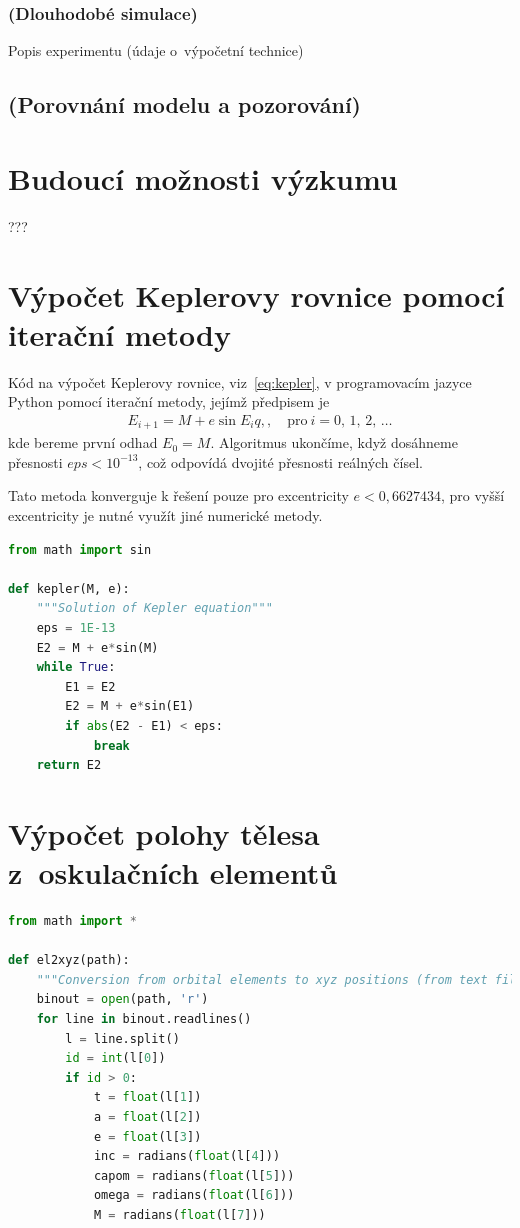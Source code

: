 \documentclass[A4paper, 12pt, oneside]{book}
\begin{document}
\subsection{(Dlouhodobé simulace)}
Popis experimentu (údaje o~výpočetní technice)
\section{(Porovnání modelu a pozorování)}

\chapter{Budoucí možnosti výzkumu}
???

\newpage

\printbibliography

\begin{appendices}
	\chapter{Výpočet Keplerovy rovnice pomocí iterační metody} \label{app:kepit}
	Kód na výpočet Keplerovy rovnice, viz~\eqref{eq:kepler}, v programovacím jazyce Python pomocí iterační metody, jejímž předpisem je
	\begin{align*}
		E_{i+1}=M+e\sin{E_i}q,, \quad \text{pro}\ i=0,\,1,\,2,\,\ldots
	\end{align*}
	kde bereme první odhad $E_0=M$. Algoritmus ukončíme, když dosáhneme přesnosti $eps<10^{-13}$, což odpovídá dvojité přesnosti reálných čísel.

	Tato metoda konverguje k řešení pouze pro excentricity $e<0,6627434$, pro vyšší excentricity je nutné využít jiné numerické metody.
\begin{lstlisting}[language=Python]
from math import sin

def kepler(M, e):
    """Solution of Kepler equation"""
    eps = 1E-13
    E2 = M + e*sin(M)
    while True:
        E1 = E2
        E2 = M + e*sin(E1)
        if abs(E2 - E1) < eps:
            break 
    return E2
\end{lstlisting}
	\chapter{Výpočet polohy tělesa z~oskulačních elementů} \label{app:el2xyz}
	\begin{lstlisting}[language=Python]
from math import *

def el2xyz(path):
    """Conversion from orbital elements to xyz positions (from text file bin.out by program follow2)"""
    binout = open(path, 'r')
    for line in binout.readlines()
        l = line.split()
        id = int(l[0])
        if id > 0:
            t = float(l[1])
            a = float(l[2])
            e = float(l[3])
            inc = radians(float(l[4]))
            capom = radians(float(l[5]))
            omega = radians(float(l[6]))
            M = radians(float(l[7]))
    

\end{lstlisting}
\end{appendices}
\end{document}
